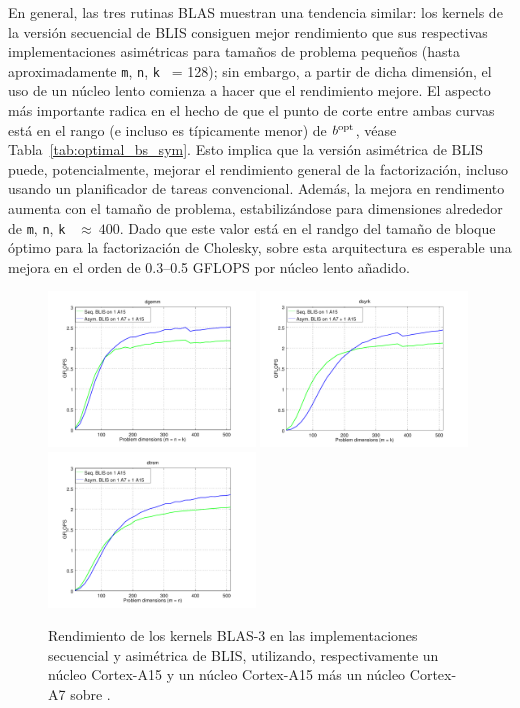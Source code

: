 En general, las tres rutinas BLAS muestran una tendencia similar: los kernels de la versión secuencial de BLIS
consiguen mejor rendimiento que sus respectivas implementaciones asimétricas para tamaños de problema pequeños (hasta
aproximadamente {\tt m}, {\tt n}, {\tt k } = 128); sin embargo, 
a partir de dicha dimensión, el uso de un núcleo lento comienza a hacer que el rendimiento mejore. 
El aspecto más importante radica en el hecho de que el punto de corte entre ambas curvas está en el rango (e incluso 
es típicamente menor) de $b^{\mbox{\rm \scriptsize opt}}$, véase Tabla~\ref{tab:optimal_bs_sym}. 
Esto implica que la versión asimétrica de BLIS puede, potencialmente, mejorar el rendimiento general de la factorización, 
incluso usando un planificador de tareas convencional.
Además, la mejora en rendimento aumenta con el tamaño de problema, estabilizándose para dimensiones alrededor de 
{\tt m}, {\tt n}, {\tt k } $\approx~400$. Dado que este valor está en el randgo del tamaño de bloque óptimo para
la factorización de Cholesky, sobre esta arquitectura es esperable una mejora en el orden de 0.3--0.5 GFLOPS por núcleo lento
añadido.

\begin{figure}[t]
\centering
\includegraphics[width=0.49\textwidth]{Plots/BLIS_small/blis_dgemm_sym_asym}
\includegraphics[width=0.49\textwidth]{Plots/BLIS_small/blis_dsyrk_sym_asym}
\includegraphics[width=0.49\textwidth]{Plots/BLIS_small/blis_dtrsm_sym_asym}
\caption{Rendimiento de los kernels BLAS-3 en las implementaciones secuencial y asimétrica de BLIS, utilizando, respectivamente
         un núcleo Cortex-A15 y un núcleo Cortex-A15 más un núcleo Cortex-A7 sobre \odroid.}
\label{fig:cross_blis}
\end{figure}


